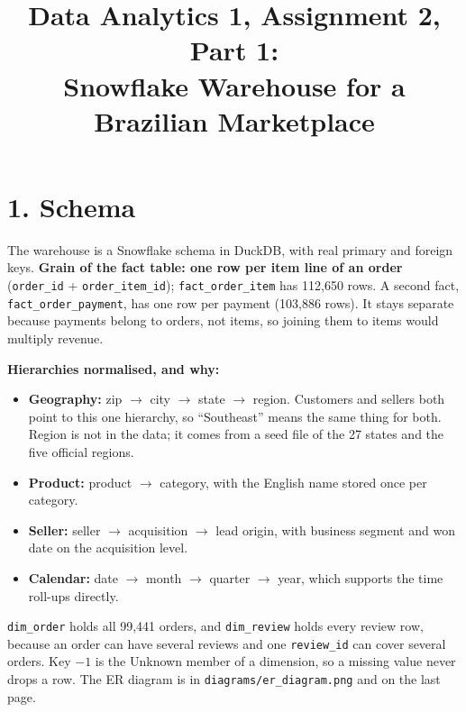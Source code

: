 \documentclass[10pt]{article}
\title{\vspace{-1.5em}Data Analytics 1, Assignment 2, Part 1:\\Snowflake Warehouse for a Brazilian Marketplace}
\author{}
\date{}
\begin{document}
\maketitle
\vspace{-3em}

\section*{1. Schema}
The warehouse is a Snowflake schema in DuckDB, with real primary and foreign keys.
\textbf{Grain of the fact table: one row per item line of an order} (\texttt{order\_id} + \texttt{order\_item\_id}); \texttt{fact\_order\_item} has 112,650 rows.
A second fact, \texttt{fact\_order\_payment}, has one row per payment (103,886 rows). It stays separate because payments belong to orders, not items, so joining them to items would multiply revenue.

\textbf{Hierarchies normalised, and why:}
\begin{itemize}
\item \textbf{Geography:} zip $\to$ city $\to$ state $\to$ region. Customers and sellers both point to this one hierarchy, so ``Southeast'' means the same thing for both. Region is not in the data; it comes from a seed file of the 27 states and the five official regions.
\item \textbf{Product:} product $\to$ category, with the English name stored once per category.
\item \textbf{Seller:} seller $\to$ acquisition $\to$ lead origin, with business segment and won date on the acquisition level.
\item \textbf{Calendar:} date $\to$ month $\to$ quarter $\to$ year, which supports the time roll-ups directly.
\end{itemize}
\texttt{dim\_order} holds all 99,441 orders, and \texttt{dim\_review} holds every review row, because an order can have several reviews and one \texttt{review\_id} can cover several orders. Key $-1$ is the Unknown member of a dimension, so a missing value never drops a row. The ER diagram is in \texttt{diagrams/er\_diagram.png} and on the last page.
\end{document}
